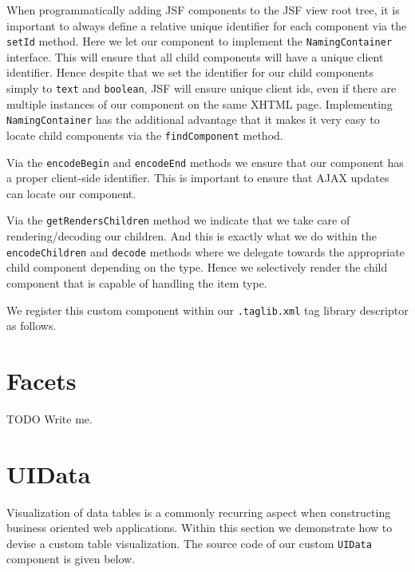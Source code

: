 When programmatically adding JSF components to the JSF view root tree, it is important to always define a relative unique identifier for each component via the \texttt{setId} method.
Here we let our component to implement the \texttt{NamingContainer} interface.
This will ensure that all child components will have a unique client identifier.
Hence despite that we set the identifier for our child components simply to \texttt{text} and \texttt{boolean}, JSF will ensure unique client ids, even if there are multiple instances of our component on the same XHTML page.
Implementing \texttt{NamingContainer} has the additional advantage that it makes it very easy to locate child components via the \texttt{findComponent} method.

Via the \texttt{encodeBegin} and \texttt{encodeEnd} methods we  ensure that our component has a proper client-side identifier.
This is important to ensure that AJAX updates can locate our component.

Via the \texttt{getRendersChildren} method we indicate that we take care of rendering/decoding our children.
And this is exactly what we do within the \texttt{encodeChildren} and \texttt{decode} methods where we delegate towards the appropriate child component depending on the type.
Hence we selectively render the child component that is capable of handling the item type.

We register this custom component within our \texttt{.taglib.xml} tag library descriptor as follows.


\section{Facets}
\begin{TODO}{TODO}
	Write me.
\end{TODO}

\section{UIData}
Visualization of data tables is a commonly recurring aspect when constructing business oriented web applications.
Within this section we demonstrate how to devise a custom table visualization.
The source code of our custom \texttt{UIData} component is given below.


